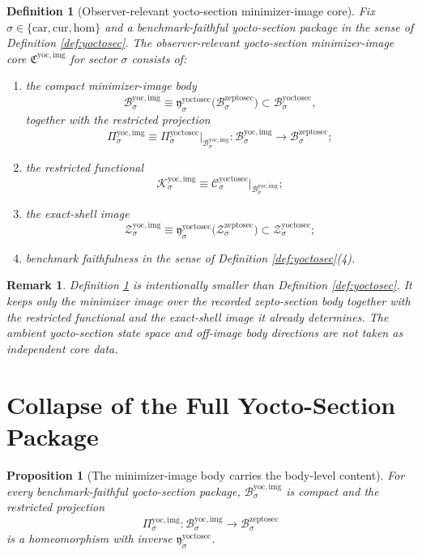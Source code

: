 \documentclass[11pt]{article}
\newcommand{\Car}{\mathrm{car}}
\newcommand{\Cur}{\mathrm{cur}}
\newcommand{\Hom}{\mathrm{hom}}
\newcommand{\ZeptoSectionBody}[1]{\mathcal B_{#1}^{\mathrm{zeptosec}}}
\newcommand{\ZeptoSectionShell}[1]{\mathcal Z_{#1}^{\mathrm{zeptosec}}}
\newcommand{\YoctoSectionBody}[1]{\mathcal B_{#1}^{\mathrm{yoctosec}}}
\newcommand{\YoctoSectionProj}[1]{\Pi_{#1}^{\mathrm{yoctosec}}}
\newcommand{\YoctoSectionZeptoMin}[1]{\mathfrak y_{#1}^{\mathrm{yoctosec}}}
\newcommand{\YoctoSectionFunctional}[1]{\mathscr C_{#1}^{\mathrm{yoctosec}}}
\newcommand{\YoctoSectionShell}[1]{\mathcal Z_{#1}^{\mathrm{yoctosec}}}
\newcommand{\YoctoImageCore}{\mathfrak C^{\mathrm{yoc,img}}}
\newcommand{\YoctoImgBody}[1]{\mathcal B_{#1}^{\mathrm{yoc,img}}}
\newcommand{\YoctoImgProj}[1]{\Pi_{#1}^{\mathrm{yoc,img}}}
\newcommand{\YoctoImgFunctional}[1]{\mathscr K_{#1}^{\mathrm{yoc,img}}}
\newcommand{\YoctoImgShell}[1]{\mathcal Z_{#1}^{\mathrm{yoc,img}}}
\newtheorem{definition}{Definition}
\newtheorem{proposition}{Proposition}
\newtheorem{remark}{Remark}
\begin{document}
\begin{definition}[Observer-relevant yocto-section minimizer-image core]
\label{def:imagecore}
Fix \(\sigma\in\{\Car,\Cur,\Hom\}\) and a benchmark-faithful yocto-section package in the sense of Definition \ref{def:yoctosec}. The \emph{observer-relevant yocto-section minimizer-image core} \(\YoctoImageCore\) for sector \(\sigma\) consists of:
\begin{enumerate}
    \item the compact minimizer-image body
    \[
    \YoctoImgBody{\sigma}
    \equiv
    \YoctoSectionZeptoMin{\sigma}\bigl(\ZeptoSectionBody{\sigma}\bigr)
    \subset
    \YoctoSectionBody{\sigma},
    \]
    together with the restricted projection
    \[
    \YoctoImgProj{\sigma}
    \equiv
    \YoctoSectionProj{\sigma}\big|_{\YoctoImgBody{\sigma}}
    :
    \YoctoImgBody{\sigma}\to\ZeptoSectionBody{\sigma};
    \]
    \item the restricted functional
    \[
    \YoctoImgFunctional{\sigma}
    \equiv
    \YoctoSectionFunctional{\sigma}\big|_{\YoctoImgBody{\sigma}};
    \]
    \item the exact-shell image
    \[
    \YoctoImgShell{\sigma}
    \equiv
    \YoctoSectionZeptoMin{\sigma}\bigl(\ZeptoSectionShell{\sigma}\bigr)
    \subset
    \YoctoSectionShell{\sigma};
    \]
    \item benchmark faithfulness in the sense of Definition \ref{def:yoctosec}(4).
\end{enumerate}
\end{definition}

\begin{remark}
Definition \ref{def:imagecore} is intentionally smaller than Definition \ref{def:yoctosec}. It keeps only the minimizer image over the recorded zepto-section body together with the restricted functional and the exact-shell image it already determines. The ambient yocto-section state space and off-image body directions are not taken as independent core data.
\end{remark}

\section{Collapse of the Full Yocto-Section Package}

\begin{proposition}[The minimizer-image body carries the body-level content]
\label{prop:body}
For every benchmark-faithful yocto-section package, \(\YoctoImgBody{\sigma}\) is compact and the restricted projection
\[
\YoctoImgProj{\sigma}:\YoctoImgBody{\sigma}\to\ZeptoSectionBody{\sigma}
\]
is a homeomorphism with inverse \(\YoctoSectionZeptoMin{\sigma}\).
\end{proposition}
\end{document}
